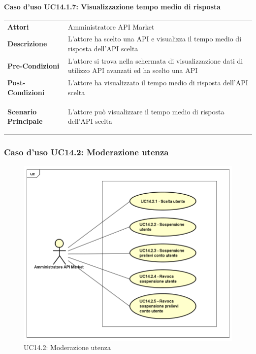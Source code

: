 \paragraph{Caso d'uso UC14.1.7: Visualizzazione tempo medio di risposta}
\label{UC14_1_7}

\begin{minipage}{\linewidth}
	\begin{tabular}{ l | p{11cm}}
		\hline
		\rowcolor{Gray}
		\multicolumn{2}{c}{UC14.1.7 - Visualizzazione tempo medio di risposta} \\
		\hline
		\textbf{Attori} & Amministratore API Market \\
		\textbf{Descrizione} & L'attore ha scelto una API e visualizza il tempo medio di risposta dell'API scelta \\
		\textbf{Pre-Condizioni} & L'attore si trova nella schermata di visualizzazione dati di utilizzo API avanzati ed ha scelto una API \\
		\textbf{Post-Condizioni} & L'attore ha visualizzato il tempo medio di risposta dell'API scelta \\
		\textbf{Scenario Principale} & 
		\begin{enumerate*}[label=(\arabic*.),itemjoin={\newline}]
			\item L'attore può visualizzare il tempo medio di risposta dell'API scelta
		\end{enumerate*}\\
	\end{tabular}
\end{minipage}

\newpage
\subsubsection{Caso d'uso UC14.2: Moderazione utenza}
\label{UC14_2}
\begin{figure}[ht]
	\centering
	\includegraphics[scale=0.45]{UML/UC14_2.png}
	\caption{UC14.2: Moderazione utenza}
\end{figure}

